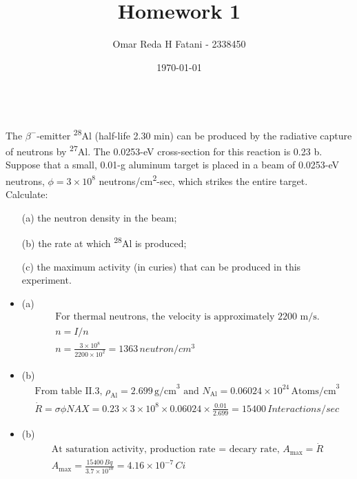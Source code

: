 \documentclass{homework}
\author{Omar Reda H Fatani - 2338450}
\date{\today}
\title{Homework 1}
\begin{document}
 \maketitle

\question \\
The $\beta^-$-emitter \textsuperscript{28}Al (half-life 2.30 min) can be produced 
by the radiative capture of neutrons by \textsuperscript{27}Al. The 0.0253-eV cross-section for this reaction is 0.23 b. Suppose 
that a small, 0.01-g aluminum target is placed in a beam of 0.0253-eV neutrons, $\phi = 3 \times 10^8$ neutrons/cm\textsuperscript{2}-sec, 
which strikes the entire target. Calculate:
\begin{enumerate}
    \item[(a)] the neutron density in the beam;
    \item[(b)] the rate at which \textsuperscript{28}Al is produced;
    \item[(c)] the maximum activity (in curies) that can be produced in this experiment. 
\end{enumerate}

\begin{sol}
  \begin{itemize}
      \item{(a)}
      \begin{gather*}
      \text{For thermal neutrons, the velocity is approximately 2200 m/s.} \\
      n = I/n 
        \\
      n = \frac{3\times 10^8}{2200\times10^2} = 1363\, neutron/cm^3
      \end{gather*}
    \item{(b)}
  \begin{gather*}
    \text{From table II.3, } \rho_{\text{Al}} = 2.699 \, \text{g/cm}^3
    \text{ and } N_{\text{Al}} = 0.06024 \times 10^{24} \, \text{Atoms/cm}^3 \\
    \dot{R} = \sigma \phi NAX = 0.23\times 3\times 10^8\times 0.06024 \times 
    \frac{0.01}{2.699} = 15400\,Interactions/sec
  \end{gather*}
    \item{(b)}
  \begin{gather*}
  \text{At saturation activity, production rate = decary rate, } A_{\text{max}} = \dot{R}\\
  A_{\text{max}} = \frac{15400\,Bq}{3.7\times 10^10} = 4.16 \times 10^{-7}\, Ci
  \end{gather*}

  \end{itemize}
  
\end{sol}
\end{document}
